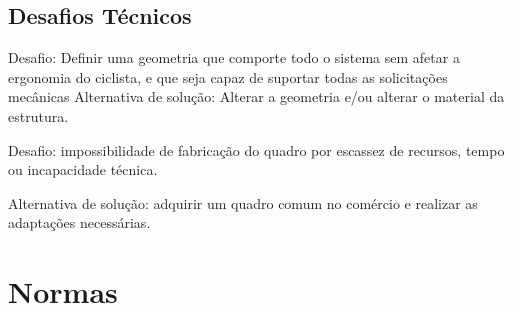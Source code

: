 \clearpage

	
	
	
	\subsection{Desafios Técnicos}
	Desafio: Definir uma geometria que comporte todo o sistema sem afetar a ergonomia do ciclista, e que seja capaz de suportar todas as solicitações mecânicas
Alternativa de solução: Alterar a geometria e/ou alterar o material da estrutura.

Desafio: impossibilidade de fabricação do quadro  por escassez de recursos, tempo ou incapacidade técnica.

Alternativa de solução: adquirir um quadro comum no comércio e realizar as adaptações necessárias.

  \section{Normas}
  